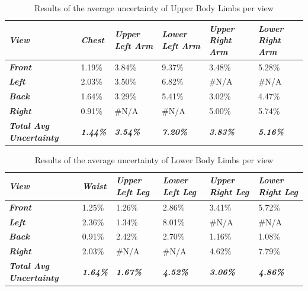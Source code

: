 \begin{table}[htbp]
	\centering
	\caption{Results of the average uncertainty of Upper Body Limbs per view}
	\begin{tabularx}{\textwidth}{|Y|Y|Y|Y|Y|Y|}
		\toprule
		\textit{\textbf{View}} & \textit{\textbf{Chest}} & \textit{\textbf{Upper Left Arm}} & \textit{\textbf{Lower Left Arm}} & \textit{\textbf{Upper Right Arm}} & \textit{\textbf{Lower Right Arm}} \\
		\midrule
		\textit{\textbf{Front}} & 1.19\% & 3.84\% & 9.37\% & 3.48\% & 5.28\% \\
		\midrule
		\textit{\textbf{Left}} & 2.03\% & 3.50\% & 6.82\% & \#N/A & \#N/A \\
		\midrule
		\textit{\textbf{Back}} & 1.64\% & 3.29\% & 5.41\% & 3.02\% & 4.47\% \\
		\midrule
		\textit{\textbf{Right}} & 0.91\% & \#N/A & \#N/A & 5.00\% & 5.74\% \\
		\midrule
		\textit{\textbf{Total Avg Uncertainty}} & \textit{\textbf{1.44\%}} & \textit{\textbf{3.54\%}} & \textit{\textbf{7.20\%}} & \textit{\textbf{3.83\%}} & \textit{\textbf{5.16\%}} \\
		\bottomrule
	\end{tabularx}%
	\label{tab:upperBodyUncertainty}%
\end{table}%

\begin{table}[htbp]
	\centering
	\caption{Results of the average uncertainty of Lower Body Limbs per view}
	\begin{tabularx}{\textwidth}{|Y|Y|Y|Y|Y|Y|}
		\toprule
		\textit{\textbf{View}} & \textit{\textbf{Waist}} & \textit{\textbf{Upper Left Leg}} & \textit{\textbf{Lower Left Leg}} & \textit{\textbf{Upper Right Leg}} & \textit{\textbf{Lower Right Leg}} \\
		\midrule
		\textit{\textbf{Front}} & 1.25\% & 1.26\% & 2.86\% & 3.41\% & 5.72\% \\
		\midrule
		\textit{\textbf{Left}} & 2.36\% & 1.34\% & 8.01\% & \#N/A & \#N/A \\
		\midrule
		\textit{\textbf{Back}} & 0.91\% & 2.42\% & 2.70\% & 1.16\% & 1.08\% \\
		\midrule
		\textit{\textbf{Right}} & 2.03\% & \#N/A & \#N/A & 4.62\% & 7.79\% \\
		\midrule
		\textit{\textbf{Total Avg Uncertainty}} & \textit{\textbf{1.64\%}} & \textit{\textbf{1.67\%}} & \textit{\textbf{4.52\%}} & \textit{\textbf{3.06\%}} & \textit{\textbf{4.86\%}} \\
		\bottomrule
	\end{tabularx}%
	\label{tab:lowerBodyUncertainty}%
\end{table}%

